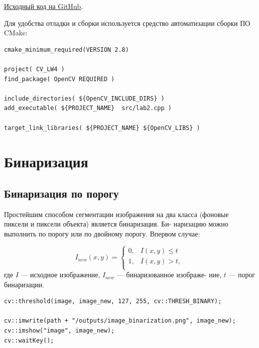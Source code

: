 \href{https://github.com/mfclabber/itmo-cv-labs/tree/main/lab4}{Исходный код на GitHub}. 

Для удобства отладки и сборки используется средство автоматизации сборки ПО CMake:
\begin{lstlisting}[style=cpp_white, caption={CMakeLists.txt для сборки проекта}]
cmake_minimum_required(VERSION 2.8)

project( CV_LW4 )
find_package( OpenCV REQUIRED )

include_directories( ${OpenCV_INCLUDE_DIRS} )
add_executable( ${PROJECT_NAME}  src/lab2.cpp )

target_link_libraries( ${PROJECT_NAME} ${OpenCV_LIBS} )
\end{lstlisting}

\section{Бинаризация}

\subsection{Бинаризация по порогу}

Простейшим способом сегментации изображения на два класса (фоновые пиксели и пиксели объекта) является бинаризация. Би-
наризацию можно выполнить по порогу или по двойному порогу. Впервом случае:

\begin{equation}
    I_{new}(x, y) = \begin{cases}
        0, & I(x, y) \leq t \\[1pt]
        1, &I(x, y) > t,\\[1pt]
    \end{cases} 
\label{eq:complex_func}
\end{equation}
где $I$ — исходное изображение, $I_{new}$ — бинаризованное изображе-
ние, $t$ — порог бинаризации.

\begin{lstlisting}[style=cpp_white, caption={Исходный код для бинаризации}]
cv::threshold(image, image_new, 127, 255, cv::THRESH_BINARY);

cv::imwrite(path + "/outputs/image_binarization.png", image_new);
cv::imshow("image", image_new);
cv::waitKey();
\end{lstlisting}

\pagebreak

